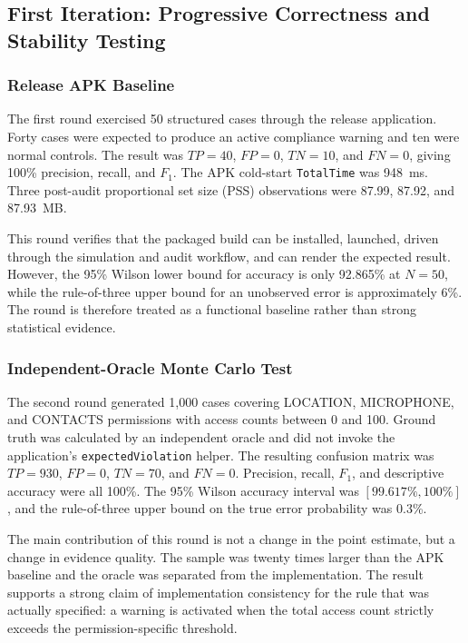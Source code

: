 \subsection{First Iteration: Progressive Correctness and Stability Testing}

\subsubsection{Release APK Baseline}

The first round exercised 50 structured cases through the release application. Forty cases were expected to produce an active compliance warning and ten were normal controls. The result was \(TP=40\), \(FP=0\), \(TN=10\), and \(FN=0\), giving 100\% precision, recall, and \(F_1\). The APK cold-start \texttt{TotalTime} was 948~ms. Three post-audit proportional set size (PSS) observations were 87.99, 87.92, and 87.93~MB.

This round verifies that the packaged build can be installed, launched, driven through the simulation and audit workflow, and can render the expected result. However, the 95\% Wilson lower bound for accuracy is only 92.865\% at \(N=50\), while the rule-of-three upper bound for an unobserved error is approximately 6\%. The round is therefore treated as a functional baseline rather than strong statistical evidence.

\subsubsection{Independent-Oracle Monte Carlo Test}

The second round generated 1,000 cases covering LOCATION, MICROPHONE, and CONTACTS permissions with access counts between 0 and 100. Ground truth was calculated by an independent oracle and did not invoke the application's \texttt{expectedViolation} helper. The resulting confusion matrix was \(TP=930\), \(FP=0\), \(TN=70\), and \(FN=0\). Precision, recall, \(F_1\), and descriptive accuracy were all 100\%. The 95\% Wilson accuracy interval was \([99.617\%,100\%]\), and the rule-of-three upper bound on the true error probability was 0.3\%.

The main contribution of this round is not a change in the point estimate, but a change in evidence quality. The sample was twenty times larger than the APK baseline and the oracle was separated from the implementation. The result supports a strong claim of implementation consistency for the rule that was actually specified: a warning is activated when the total access count strictly exceeds the permission-specific threshold.

